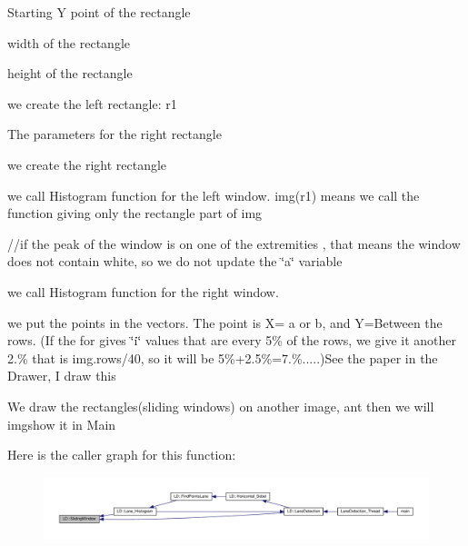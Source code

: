Starting Y point of the rectangle

width of the rectangle

height of the rectangle

we create the left rectangle\+: r1

The parameters for the right rectangle

we create the right rectangle

we call Histogram function for the left window. img(r1) means we call the function giving only the rectangle part of img

//if the peak of the window is on one of the extremities , that means the window does not contain white, so we do not update the \char`\"{}a\char`\"{} variable

we call Histogram function for the right window.

we put the points in the vectors. The point is X= a or b, and Y=Between the rows. (If the for gives \char`\"{}i\char`\"{} values that are every 5\% of the rows, we give it another 2.\% that is img.\+rows/40, so it will be 5\%+2.5\%=7.\%.....)See the paper in the Drawer, I draw this

We draw the rectangles(sliding windows) on another image, ant then we will imgshow it in Main 

Here is the caller graph for this function\+:\nopagebreak
\begin{figure}[H]
\begin{center}
\leavevmode
\includegraphics[width=350pt]{namespaceLD_a1d90a5e486727d57152101c7c6e2c6b2_icgraph}
\end{center}
\end{figure}


